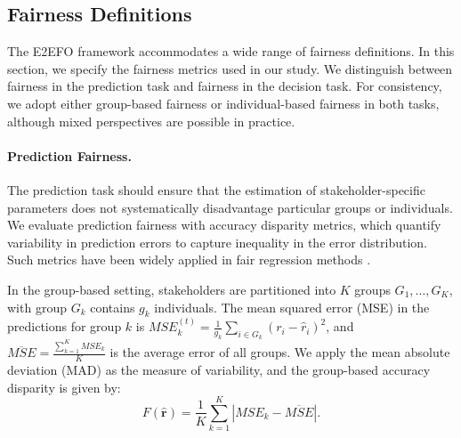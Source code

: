 \documentclass[ijoc,sglanonrev]{informs4}
\begin{document}
\subsection{Fairness Definitions} \label{sec:fairness-def}
The E2EFO framework accommodates a wide range of fairness definitions. In this section, we specify the fairness metrics used in our study. We distinguish between fairness in the prediction task and fairness in the decision task. For consistency, we adopt either group-based fairness or individual-based fairness in both tasks, although mixed perspectives are possible in practice.

\paragraph{Prediction Fairness.} 
The prediction task should ensure that the estimation of stakeholder-specific parameters does not systematically disadvantage particular groups or individuals. We evaluate prediction fairness with accuracy disparity metrics, which quantify variability in prediction errors to capture inequality in the error distribution. Such metrics have been widely applied in fair regression methods \citep{berk2017convex, agarwal2019fair}.

In the group-based setting, stakeholders are partitioned into $K$ groups $G_1, \ldots, G_K$, with group $G_k$ contains $g_k$ individuals. The mean squared error (MSE) in the predictions for group $k$ is $MSE^{(t)}_k = \frac{1}{g_k}\sum_{i \in G_k} (r_{i}-\hat{r}_{i})^2$, and $\overline{MSE} = \frac{\sum_{k=1}^K MSE_k}{K}$ is the average error of all groups. 
We apply the mean absolute deviation (MAD) as the measure of variability, and the group-based accuracy disparity is given by:
\begin{equation} \label{def:group-acc-parity}
    F(\hat{\mathbf{r}}) = \frac{1}{K} \sum_{k=1}^K |MSE_k - \overline{MSE}|.
\end{equation}
\end{document}
